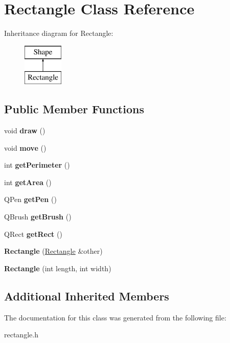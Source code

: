 \hypertarget{class_rectangle}{}\section{Rectangle Class Reference}
\label{class_rectangle}
Inheritance diagram for Rectangle\+:\begin{figure}[H]
\begin{center}
\leavevmode
\includegraphics[height=2.000000cm]{class_rectangle}
\end{center}
\end{figure}
\subsection*{Public Member Functions}
\begin{DoxyCompactItemize}
\item 
\mbox{\label{class_rectangle_ac895c67f1d6337e3b4f72663b17dd299}} 
void {\bfseries draw} ()
\item 
\mbox{\label{class_rectangle_ac22f117344cc27842d78465573ade090}} 
void {\bfseries move} ()
\item 
\mbox{\label{class_rectangle_a59cc981af638e29c752eb38d470eb0dc}} 
int {\bfseries get\+Perimeter} ()
\item 
\mbox{\label{class_rectangle_a5d7633ce9d9bd356f0a8ce1eb5b4b2ae}} 
int {\bfseries get\+Area} ()
\item 
\mbox{\label{class_rectangle_af81f6576c829b41bfe0b7852931a7107}} 
Q\+Pen {\bfseries get\+Pen} ()
\item 
\mbox{\label{class_rectangle_a6f328f3878366ba97f845eca63f9f2c0}} 
Q\+Brush {\bfseries get\+Brush} ()
\item 
\mbox{\label{class_rectangle_af0c06d1e26a2a296b380fcf0e157d78e}} 
Q\+Rect {\bfseries get\+Rect} ()
\item 
\mbox{\label{class_rectangle_a14bebb658c850ef730fb3e65adab1f91}} 
{\bfseries Rectangle} (\mbox{\hyperlink{class_rectangle}{Rectangle}} \&other)
\item 
\mbox{\label{class_rectangle_ac2bb13ef1af8fe288bf46c92e95fb875}} 
{\bfseries Rectangle} (int length, int width)
\end{DoxyCompactItemize}
\subsection*{Additional Inherited Members}


The documentation for this class was generated from the following file\+:\begin{DoxyCompactItemize}
\item 
rectangle.\+h\end{DoxyCompactItemize}
